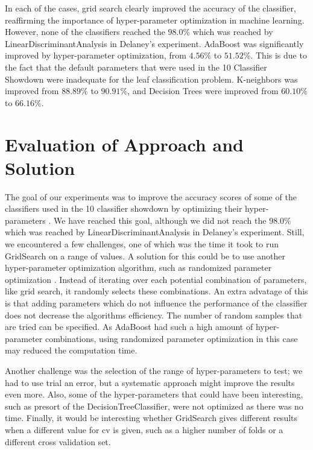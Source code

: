 \documentclass{article}
\begin{document}
In each of the cases, grid search clearly improved the accuracy of the classifier, reaffirming the importance of hyper-parameter optimization in machine learning. 
However, none of the classifiers reached the $98.0\%$ which was reached by LinearDiscriminantAnalysis in Delaney's experiment. AdaBoost was significantly improved by hyper-parameter optimization, from $4.56\%$ to $51.52\%$. This is due to the fact that the default parameters that were used in the 10 Classifier Showdown \cite{showdown} were inadequate for the leaf classification problem. K-neighbors was improved from $88.89\%$ to $90.91\%$, and Decision Trees were improved from $60.10\%$ to $66.16\%$. 

\section{Evaluation of Approach and Solution} 
	The goal of our experiments was to improve the accuracy scores of some of the classifiers used in the 10 classifier showdown by optimizing their hyper-parameters \cite{showdown}. We have reached this goal, although we did not reach the $98.0\%$ which was reached by LinearDiscriminantAnalysis in Delaney's experiment. Still, we encountered a few challenges, one of which was the time it took to run GridSearch on a range of values. A solution for this could be to use another hyper-parameter optimization algorithm, such as randomized parameter optimization \cite{gridsearch}. Instead of iterating over each potential combination of parameters, like grid search, it randomly selects these combinations. An extra advatage of this is that adding parameters which do not influence the performance of the classifier does not decrease the algorithms efficiency. The number of random samples that are tried can be specified.  As AdaBoost had such a high amount of hyper-parameter combinations, using randomized parameter optimization in this case may reduced the computation time.
	
	Another challenge was the selection of  the range of hyper-parameters to test; we had to use trial an error, but a systematic approach might improve the results even more. Also, some of the hyper-parameters that could have been interesting, such as presort of the DecisionTreeClassifier, were not optimized as there was no time. Finally, it would be interesting whether GridSearch gives different results when a different value for cv is given, such as a higher number of folds or a different cross validation set.




\end{document}
